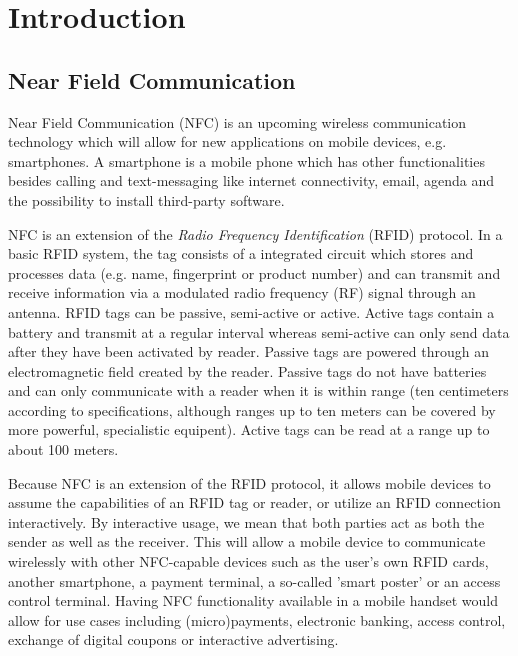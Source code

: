 \section{Introduction}


\subsection{Near Field Communication} %
Near Field Communication (NFC) is an upcoming wireless communication technology which will allow for new applications on mobile devices, e.g. smartphones.
A smartphone is a mobile phone which has other functionalities besides calling and text-messaging like internet connectivity, email, agenda and the possibility to install third-party software.

NFC is an extension of the \textit{Radio Frequency Identification} (RFID) protocol.
In a basic RFID system, the tag consists of a integrated circuit which stores and processes data (e.g. name, fingerprint or product number) and can transmit and receive information via a modulated radio frequency (RF) signal through an antenna.
RFID tags can be passive, semi-active or active.
Active tags contain a battery and transmit at a regular interval whereas semi-active can only send data after they have been activated by reader.
Passive tags are powered through an electromagnetic field created by the reader.
Passive tags do not have batteries and can only communicate with a reader when it is within range (ten centimeters according to specifications, although ranges up to ten meters can be covered by more powerful, specialistic equipent).
Active tags can be read at a range up to about 100 meters.
 
Because NFC is an extension of the RFID protocol, it allows mobile devices to assume the capabilities of an RFID tag or reader, or utilize an RFID connection interactively.
By interactive usage, we mean that both parties act as both the sender as well as the receiver.
This will allow a mobile device to communicate wirelessly  with other NFC-capable devices such as the user's own RFID cards, another smartphone, a payment terminal, a so-called 'smart poster' or an access control terminal.
Having NFC functionality available in a mobile handset would allow for use cases including (micro)payments, electronic banking, access control, exchange of digital coupons or interactive advertising.

